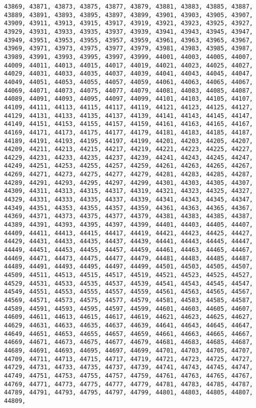 \documentclass[11pt]{article}
\begin{document}
\begin{Verbatim}[commandchars=\\\{\}]
43869, 43871, 43873, 43875, 43877, 43879, 43881, 43883, 43885, 43887, 43889, 43891, 43893, 43895, 43897, 43899, 43901, 43903, 43905, 43907, 43909, 43911, 43913, 43915, 43917, 43919, 43921, 43923, 43925, 43927, 43929, 43931, 43933, 43935, 43937, 43939, 43941, 43943, 43945, 43947, 43949, 43951, 43953, 43955, 43957, 43959, 43961, 43963, 43965, 43967, 43969, 43971, 43973, 43975, 43977, 43979, 43981, 43983, 43985, 43987, 43989, 43991, 43993, 43995, 43997, 43999, 44001, 44003, 44005, 44007, 44009, 44011, 44013, 44015, 44017, 44019, 44021, 44023, 44025, 44027, 44029, 44031, 44033, 44035, 44037, 44039, 44041, 44043, 44045, 44047, 44049, 44051, 44053, 44055, 44057, 44059, 44061, 44063, 44065, 44067, 44069, 44071, 44073, 44075, 44077, 44079, 44081, 44083, 44085, 44087, 44089, 44091, 44093, 44095, 44097, 44099, 44101, 44103, 44105, 44107, 44109, 44111, 44113, 44115, 44117, 44119, 44121, 44123, 44125, 44127, 44129, 44131, 44133, 44135, 44137, 44139, 44141, 44143, 44145, 44147, 44149, 44151, 44153, 44155, 44157, 44159, 44161, 44163, 44165, 44167, 44169, 44171, 44173, 44175, 44177, 44179, 44181, 44183, 44185, 44187, 44189, 44191, 44193, 44195, 44197, 44199, 44201, 44203, 44205, 44207, 44209, 44211, 44213, 44215, 44217, 44219, 44221, 44223, 44225, 44227, 44229, 44231, 44233, 44235, 44237, 44239, 44241, 44243, 44245, 44247, 44249, 44251, 44253, 44255, 44257, 44259, 44261, 44263, 44265, 44267, 44269, 44271, 44273, 44275, 44277, 44279, 44281, 44283, 44285, 44287, 44289, 44291, 44293, 44295, 44297, 44299, 44301, 44303, 44305, 44307, 44309, 44311, 44313, 44315, 44317, 44319, 44321, 44323, 44325, 44327, 44329, 44331, 44333, 44335, 44337, 44339, 44341, 44343, 44345, 44347, 44349, 44351, 44353, 44355, 44357, 44359, 44361, 44363, 44365, 44367, 44369, 44371, 44373, 44375, 44377, 44379, 44381, 44383, 44385, 44387, 44389, 44391, 44393, 44395, 44397, 44399, 44401, 44403, 44405, 44407, 44409, 44411, 44413, 44415, 44417, 44419, 44421, 44423, 44425, 44427, 44429, 44431, 44433, 44435, 44437, 44439, 44441, 44443, 44445, 44447, 44449, 44451, 44453, 44455, 44457, 44459, 44461, 44463, 44465, 44467, 44469, 44471, 44473, 44475, 44477, 44479, 44481, 44483, 44485, 44487, 44489, 44491, 44493, 44495, 44497, 44499, 44501, 44503, 44505, 44507, 44509, 44511, 44513, 44515, 44517, 44519, 44521, 44523, 44525, 44527, 44529, 44531, 44533, 44535, 44537, 44539, 44541, 44543, 44545, 44547, 44549, 44551, 44553, 44555, 44557, 44559, 44561, 44563, 44565, 44567, 44569, 44571, 44573, 44575, 44577, 44579, 44581, 44583, 44585, 44587, 44589, 44591, 44593, 44595, 44597, 44599, 44601, 44603, 44605, 44607, 44609, 44611, 44613, 44615, 44617, 44619, 44621, 44623, 44625, 44627, 44629, 44631, 44633, 44635, 44637, 44639, 44641, 44643, 44645, 44647, 44649, 44651, 44653, 44655, 44657, 44659, 44661, 44663, 44665, 44667, 44669, 44671, 44673, 44675, 44677, 44679, 44681, 44683, 44685, 44687, 44689, 44691, 44693, 44695, 44697, 44699, 44701, 44703, 44705, 44707, 44709, 44711, 44713, 44715, 44717, 44719, 44721, 44723, 44725, 44727, 44729, 44731, 44733, 44735, 44737, 44739, 44741, 44743, 44745, 44747, 44749, 44751, 44753, 44755, 44757, 44759, 44761, 44763, 44765, 44767, 44769, 44771, 44773, 44775, 44777, 44779, 44781, 44783, 44785, 44787, 44789, 44791, 44793, 44795, 44797, 44799, 44801, 44803, 44805, 44807, 44809, 
\end{Verbatim}
\end{document}
